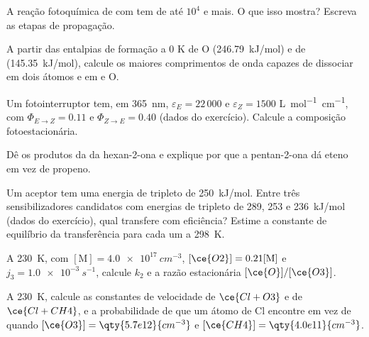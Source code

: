 \begin{exercise}[$\star$]\label{exo:b3:photochemistry:3}
A reação fotoquímica de  com  tem  de até $10^4$
e mais. O que isso mostra? Escreva as etapas de propagação.
\end{exercise}

\begin{exercise}[$\star$]\label{exo:b3:photochemistry:4}
A partir das entalpias de formação a 0 K de O (\qty{246.79}{kJ/mol}) e de 
(\qty{145.35}{kJ/mol}), calcule os maiores comprimentos de onda capazes de dissociar
 em dois átomos e  em  e O.
\end{exercise}

\begin{exercise}[$\star\star$]\label{exo:b3:photochemistry:5}
Um fotointerruptor tem, em \qty{365}{nm}, $\varepsilon_E = 22\,000$ e $\varepsilon_Z = 1500$ \unit{L.mol^{-1}.cm^{-1}}, com
$\Phi_{E\to Z} = 0.11$ e $\Phi_{Z\to E} = 0.40$ (dados do exercício). Calcule a composição
fotoestacionária.
\end{exercise}

\begin{exercise}[$\star\star$]\label{exo:b3:photochemistry:6}
Dê os produtos da  da hexan-2-ona e explique por que
a pentan-2-ona dá eteno em vez de propeno.
\end{exercise}

\begin{exercise}[$\star\star$]\label{exo:b3:photochemistry:7}
Um aceptor tem uma energia de tripleto de \qty{250}{kJ/mol}. Entre três
sensibilizadores candidatos com energias de tripleto de 289, 253 e \qty{236}{kJ/mol}
(dados do exercício), qual transfere com eficiência? Estime a constante de
equilíbrio da transferência para cada um a \qty{298}{K}.
\end{exercise}

\begin{exercise}[$\star\star$]\label{exo:b3:photochemistry:8}
A \qty{230}{K}, com $[\mathrm M] = \qty{4.0e17}{cm^{-3}}$, $[\ce{O2}] = 0.21[\mathrm M]$ e $j_3 = \qty{1.0e-3}{s^{-1}}$,
calcule $k_2$ e a razão estacionária $[\ce{O}]/[\ce{O3}]$.
\end{exercise}

\begin{exercise}[$\star\star$]\label{exo:b3:photochemistry:9}
A \qty{230}{K}, calcule as constantes de velocidade de $\ce{Cl + O3}$ e de $\ce{Cl + CH4}$, e a
probabilidade de que um átomo de Cl encontre  em vez de  quando $[\ce{O3}] = \qty{5.7e12}{cm^{-3}}$
e $[\ce{CH4}] = \qty{4.0e11}{cm^{-3}}$.
\end{exercise}

